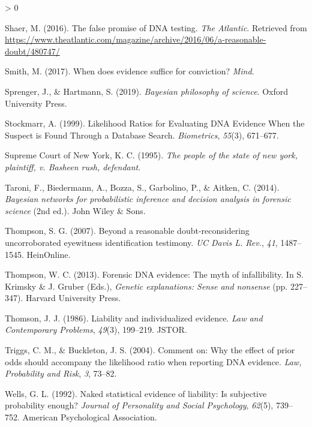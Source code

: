 \documentclass[
  10pt,
  dvipsnames,enabledeprecatedfontcommands]{scrartcl}
\newlength{\cslhangindent}
\newenvironment{CSLReferences}[2] %
 {%
  \setlength{\parindent}{0pt}
  \ifodd #1 \everypar{\setlength{\hangindent}{\cslhangindent}}\ignorespaces\fi
  \ifnum #2 > 0
  \setlength{\parskip}{#2\baselineskip}
  \fi
 }%
 {}
\begin{document}
\begin{CSLReferences}{1}{0}
\leavevmode\hypertarget{ref-Shaer2016False}{}%
Shaer, M. (2016). The false promise of DNA testing. \emph{The Atlantic}.
Retrieved from
\url{https://www.theatlantic.com/magazine/archive/2016/06/a-reasonable-doubt/480747/}

\leavevmode\hypertarget{ref-Smith2018evidence}{}%
Smith, M. (2017). When does evidence suffice for conviction?
\emph{Mind}.

\leavevmode\hypertarget{ref-sprenger2019bayesian}{}%
Sprenger, J., \& Hartmann, S. (2019). \emph{Bayesian philosophy of
science}. Oxford University Press.

\leavevmode\hypertarget{ref-stockmarr1999LikelihoodRatiosEvaluating}{}%
Stockmarr, A. (1999). Likelihood {Ratios} for {Evaluating DNA Evidence
When} the {Suspect} is {Found Through} a {Database Search}.
\emph{Biometrics}, \emph{55}(3), 671--677.

\leavevmode\hypertarget{ref-Rush1995}{}%
Supreme Court of New York, K. C. (1995). \emph{The people of the state
of new york, plaintiff, v. Basheen rush, defendant}.

\leavevmode\hypertarget{ref-taroni2006bayesian}{}%
Taroni, F., Biedermann, A., Bozza, S., Garbolino, P., \& Aitken, C.
(2014). \emph{Bayesian networks for probabilistic inference and decision
analysis in forensic science} (2nd ed.). John Wiley \& Sons.

\leavevmode\hypertarget{ref-thompson2007beyond}{}%
Thompson, S. G. (2007). Beyond a reasonable doubt-reconsidering
uncorroborated eyewitness identification testimony. \emph{UC Davis L.
Rev.}, \emph{41}, 1487--1545. HeinOnline.

\leavevmode\hypertarget{ref-thompson2012forensic}{}%
Thompson, W. C. (2013). Forensic DNA evidence: The myth of
infallibility. In S. Krimsky \& J. Gruber (Eds.), \emph{Genetic
explanations: Sense and nonsense} (pp. 227--347). Harvard University
Press.

\leavevmode\hypertarget{ref-thomson1986liability}{}%
Thomson, J. J. (1986). Liability and individualized evidence. \emph{Law
and Contemporary Problems}, \emph{49}(3), 199--219. JSTOR.

\leavevmode\hypertarget{ref-triggsCommentWhyEffect}{}%
Triggs, C. M., \& Buckleton, J. S. (2004). Comment on: {Why} the effect
of prior odds should accompany the likelihood ratio when reporting {DNA}
evidence. \emph{Law, Probability and Risk}, \emph{3}, 73--82.

\leavevmode\hypertarget{ref-wells1992naked}{}%
Wells, G. L. (1992). Naked statistical evidence of liability: Is
subjective probability enough? \emph{Journal of Personality and Social
Psychology}, \emph{62}(5), 739--752. American Psychological Association.


\end{CSLReferences}
\end{document}
